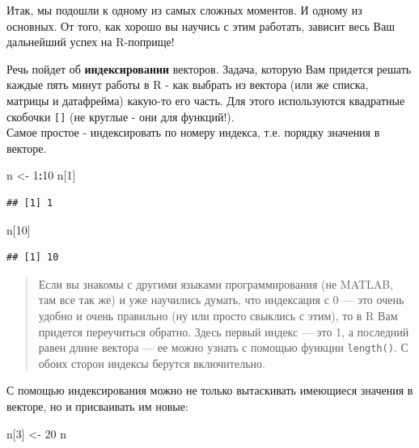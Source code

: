 \documentclass[
]{book}
\newenvironment{Shaded}{\begin{snugshade}}{\end{snugshade}}
\newcommand{\DecValTok}[1]{\textcolor[rgb]{0.00,0.00,0.81}{#1}}
\newcommand{\NormalTok}[1]{#1}
\newcommand{\OperatorTok}[1]{\textcolor[rgb]{0.81,0.36,0.00}{\textbf{#1}}}
\newcommand{\StringTok}[1]{\textcolor[rgb]{0.31,0.60,0.02}{#1}}
\begin{document}
Итак, мы подошли к одному из самых сложных моментов. И одному из основных. От того, как хорошо вы научись с этим работать, зависит весь Ваш дальнейший успех на R-поприще!

Речь пойдет об \textbf{индексировании} векторов. Задача, которую Вам придется решать каждые пять минут работы в R - как выбрать из вектора (или же списка, матрицы и датафрейма) какую-то его часть. Для этого используются квадратные скобочки \texttt{{[}{]}} (не круглые - они для функций!).\\
Самое простое - индексировать по номеру индекса, т.е. порядку значения в векторе.

\begin{Shaded}
\begin{Highlighting}[]
\NormalTok{n <-}\StringTok{ }\DecValTok{1}\OperatorTok{:}\DecValTok{10}
\NormalTok{n[}\DecValTok{1}\NormalTok{]}
\end{Highlighting}
\end{Shaded}

\begin{verbatim}
## [1] 1
\end{verbatim}

\begin{Shaded}
\begin{Highlighting}[]
\NormalTok{n[}\DecValTok{10}\NormalTok{]}
\end{Highlighting}
\end{Shaded}

\begin{verbatim}
## [1] 10
\end{verbatim}

\begin{quote}
Если вы знакомы с другими языками программирования (не MATLAB, там все так же) и уже научились думать, что индексация с 0 --- это очень удобно и очень правильно (ну или просто свыклись с этим), то в R Вам придется переучиться обратно. Здесь первый индекс --- это 1, а последний равен длине вектора --- ее можно узнать с помощью функции \texttt{length()}. С обоих сторон индексы берутся включительно.
\end{quote}

С помощью индексирования можно не только вытаскивать имеющиеся значения в векторе, но и присваивать им новые:

\begin{Shaded}
\begin{Highlighting}[]
\NormalTok{n[}\DecValTok{3}\NormalTok{] <-}\StringTok{ }\DecValTok{20}
\NormalTok{n}
\end{Highlighting}
\end{Shaded}
\end{document}
